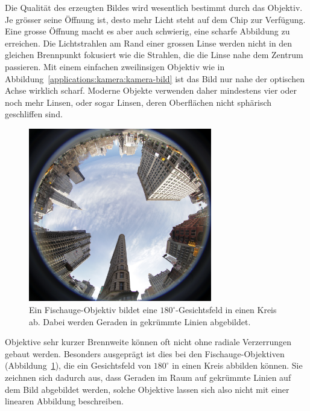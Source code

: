 Die Qualität des erzeugten Bildes wird wesentlich bestimmt durch das
Objektiv.
Je grösser seine Öffnung ist, desto mehr Licht steht auf dem Chip zur
Verfügung.
Eine grosse Öffnung macht es aber auch schwierig, eine scharfe Abbildung
zu erreichen.
Die Lichtstrahlen am Rand einer grossen Linse werden nicht in den gleichen
Brennpunkt fokusiert wie die Strahlen, die die Linse nahe dem Zentrum
passieren.
Mit einem einfachen zweilinsigen Objektiv wie in
Abbildung~\ref{applications:kamera:kamera-bild} ist das Bild nur nahe
der optischen Achse wirklich scharf.
Moderne Objekte verwenden daher mindestens vier oder noch mehr Linsen,
oder sogar Linsen, deren Oberflächen nicht sphärisch geschliffen sind.

\begin{figure}
\centering
\includegraphics[width=8cm]{applications/kamera/fisheye.jpg}
\caption{Ein Fischauge-Objektiv bildet eine $180^\circ$-Gesichtsfeld in
einen Kreis ab.
Dabei werden Geraden in gekrümmte Linien abgebildet.
\label{applications:kamera:fisheye}}
\end{figure}%
Objektive sehr kurzer Brennweite können oft nicht ohne radiale Verzerrungen
gebaut werden.
Besonders ausgeprägt ist dies bei den Fischauge-Objektiven
(Abbildung~\ref{applications:kamera:fisheye}), die
ein Gesichtsfeld von $180^\circ$ in einen Kreis abbilden können.
Sie zeichnen sich dadurch aus, dass Geraden im Raum auf gekrümmte
Linien auf dem Bild abgebildet werden, solche Objektive lassen sich
also nicht mit einer linearen Abbildung beschreiben.

